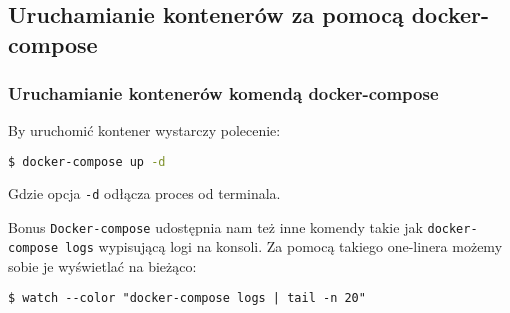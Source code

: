 \documentclass{beamer}
\begin{document}
\subsection{Uruchamianie kontenerów za pomocą docker-compose}
\begin{frame}[fragile]
    \frametitle{Uruchamianie kontenerów komendą docker-compose}
    By uruchomić kontener wystarczy polecenie:
    \begin{lstlisting}[frame=single,basicstyle=\footnotesize\ttfamily,language=bash,morekeywords={docker-compose}]
$ docker-compose up -d
    \end{lstlisting}
    Gdzie opcja \texttt{-d} odłącza proces od terminala.
    \pause
    \begin{block}{Bonus}
        \texttt{Docker-compose} udostępnia nam też inne komendy takie jak \texttt{docker-compose logs} wypisującą logi na konsoli. Za pomocą takiego one-linera możemy sobie je wyświetlać na bieżąco:
        \begin{center}\begin{minipage}{0.9\textwidth}
        \begin{lstlisting}[frame=single,basicstyle=\scriptsize\ttfamily,morekeywords={tail,docker-compose,watch}]
$ watch --color "docker-compose logs | tail -n 20"
    \end{lstlisting}
        \end{minipage}\end{center}
    \end{block}
\end{frame}
\end{document}
